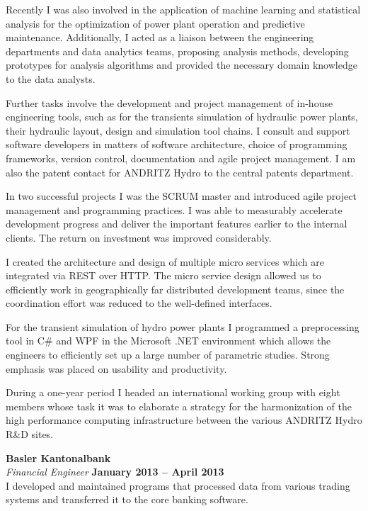\documentclass[line,11pt,a4paper]{../resume}
\begin{document}
\begin{resume}
Recently I was also involved in the application of machine learning
and statistical analysis for the optimization of power plant operation and
predictive maintenance. Additionally, I acted as a liaison between the engineering
departments and data analytics teams, proposing analysis methods, developing
prototypes for analysis algorithms and provided the necessary domain knowledge
to the data analysts.

Further tasks involve the development and project management of in-house
engineering tools, such as for the transients simulation of hydraulic power
plants, their hydraulic layout, design and simulation tool chains. I consult
and support software developers in matters of software architecture, choice
of programming frameworks, version control, documentation and agile project
management. I am also the patent contact for ANDRITZ Hydro to the central
patents department.

In two successful projects I was the SCRUM master and introduced agile
project management and programming practices. I was able to measurably
accelerate development progress and deliver the important features earlier
to the internal clients. The return on investment was improved considerably.

I created the architecture and design of multiple micro services which
are integrated via REST over HTTP. The micro service design allowed us to
efficiently work in geographically far distributed development teams, since the
coordination effort was reduced to the well-defined interfaces.

For the transient simulation of hydro power plants I programmed a preprocessing
tool in C\# and WPF in the Microsoft .NET environment which allows the
engineers to efficiently set up a large number of parametric studies. Strong
emphasis was placed on usability and productivity.

During a one-year period I headed an international working group with eight
members whose task it was to elaborate a strategy for the harmonization of the
high performance computing infrastructure between the various ANDRITZ Hydro
R\&D sites.

\textbf{Basler Kantonalbank} \vspace{2mm}\\\vspace{1mm}%
\textsl{Financial Engineer} \hfill \textbf{January 2013 -- April 2013}\\
I developed and maintained programs that processed data from various trading
systems and transferred it to the core banking software.


\end{resume}
\end{document}
